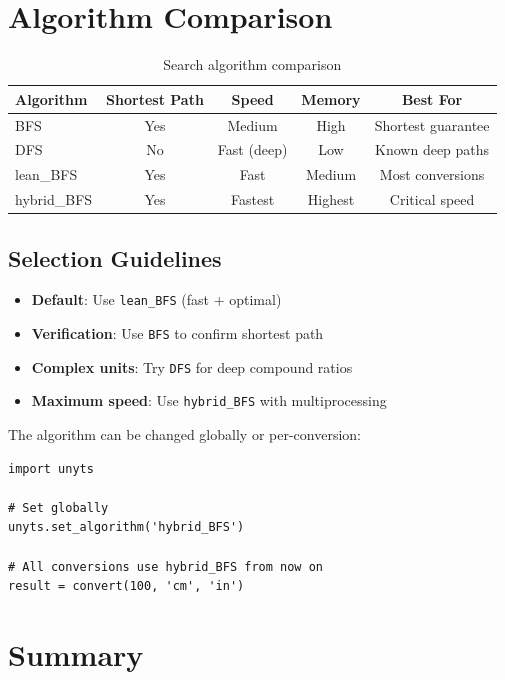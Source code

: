 \documentclass[11pt,a4paper]{report}
\begin{document}
\section{Algorithm Comparison}

\begin{table}[h]
\centering
\begin{tabular}{@{}lcccc@{}}
\toprule
\textbf{Algorithm} & \textbf{Shortest Path} & \textbf{Speed} & \textbf{Memory} & \textbf{Best For} \\
\midrule
BFS & Yes & Medium & High & Shortest guarantee \\
DFS & No & Fast (deep) & Low & Known deep paths \\
lean\_BFS & Yes & Fast & Medium & Most conversions \\
hybrid\_BFS & Yes & Fastest & Highest & Critical speed \\
\bottomrule
\end{tabular}
\caption{Search algorithm comparison}
\label{tab:algorithm_comparison}
\end{table}

\subsection{Selection Guidelines}

\begin{itemize}[leftmargin=*]
  \item \textbf{Default}: Use \texttt{lean\_BFS} (fast + optimal)
  \item \textbf{Verification}: Use \texttt{BFS} to confirm shortest path
  \item \textbf{Complex units}: Try \texttt{DFS} for deep compound ratios
  \item \textbf{Maximum speed}: Use \texttt{hybrid\_BFS} with multiprocessing
\end{itemize}

The algorithm can be changed globally or per-conversion:

\begin{lstlisting}[style=pythonstyle]
import unyts

# Set globally
unyts.set_algorithm('hybrid_BFS')

# All conversions use hybrid_BFS from now on
result = convert(100, 'cm', 'in')
\end{lstlisting}

\section{Summary}
\end{document}
